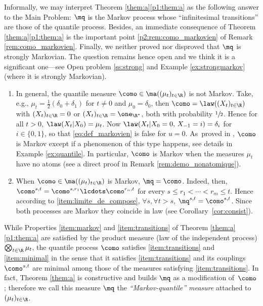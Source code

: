 Informally, we may interpret Theorem \ref{them:a}\eqref{p1:them:a} as the following answer to the Main Problem: $\mq$ is the Markov process whose ``infinitesimal transitions'' are those of the quantile process. Besides, an immediate consequence of Theorem \ref{them:a}\eqref{p1:them:a} is the important point \eqref{p2:rem:como_markovien} of Remark \ref{rem:como_markovien}. Finally, we neither proved nor disproved that $\mq$ is strongly Markovian. The question remains hence open and we think it is a significant one---see Open problem \ref{ss:strong} and Example \ref{ex:strongmarkov} (where it is strongly Markovian).

\skpt
\begin{rem}\label{rem:como_markovien}
\begin{enumerate}
\item
\label{p1:rem:como_markovien} In general, the quantile measure $\como\in\ma((\mu_t)_{t\in \R})$ is not Markov. Take, e.g., $\mu_t=\frac12(\delta_0+\delta_1)$ for $t\neq0$ and $\mu_0=\delta_0$, then $\como=\law((X_t)_{t\in\R})$ with $(X_t)_{t\in\R}=0$ or $(X_t)_{t\in\R}=\one_{\R^\ast}$, both with probability $\sfrac12$. Hence for all $t>0$, $\law(X_t|X_0)=\mu_t$. Now $\law(X_t|X_0=0,\,X_{-1}=i)=\delta_i$ for $i\in\{0,1\}$, so that \eqref{eq:def_markovien} is false for $u=0$. As~proved in \cite[Prop.\,3]{Ju_seminaire}, $\como$ is Markov except if a phenomenon of this type happens, see details in Example \ref{ex:quantile}.
In particular, $\como$ is Markov when the measures $\mu_t$ have no atoms (see a direct proof in Remark \ref{rem:demo_nonatomique}).

\item\label{p2:rem:como_markovien} When $\como\in\ma((\mu_t)_{t\in \R})$ is Markov, $\mq=\como$. Indeed, then, $\como^{s,t}=\como^{s,r_1}\lcdots \como^{r_n,t}$ for every $s\leq r_1<\cdots<r_m\leq t$. Hence according to \eqref{item:limite_de_compose}, $\forall s, \forall t>s$, $\mq^{s,t}=\como^{s,t}$. Since both processes are Markov they coincide in law (see Corollary~\ref{cor:consist}).
\end{enumerate}
\end{rem}

\begin{rem}While Properties \eqref{item:markov} and \eqref{item:transitions} of Theorem \ref{them:a}\eqref{p1:them:a} are satisfied by the product measure (law of the independent process) $\bigotimes_{t\in \R} \mu_t$, the quantile process $\como$ satisfies \eqref{item:transitions} and \eqref{item:minimal} in the sense that it satisfies \eqref{item:transitions} and its couplings $\como^{s,t}$ are minimal among those of the measures satisfying \eqref{item:transitions}. In fact, Theorem \ref{them:a} is constructive and builds $\mq$ as a modification of~$\como$; therefore we call this measure $\mq$ the \emph{``Markov-quantile'' measure} attached to $(\mu_t)_{t\in\R}$.
\end{rem}

